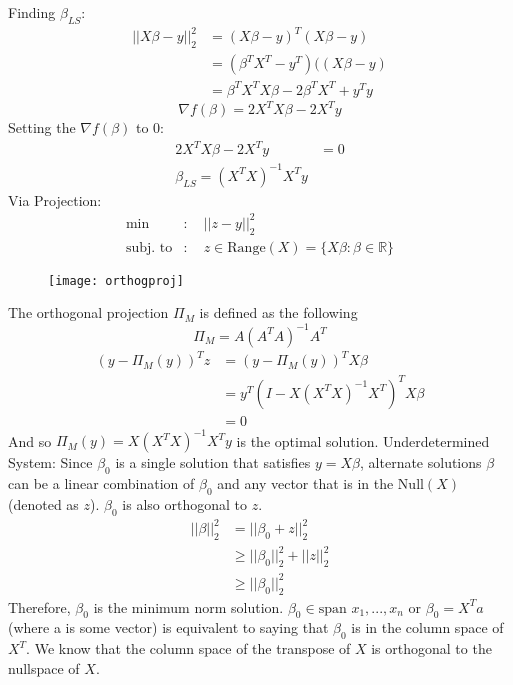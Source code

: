 \documentclass{article}
\begin{document}
\newpage
\noindent
Finding $\beta_{LS}$:
\begin{align*}
	||X\beta - y||^2_2 &= (X\beta - y)^T(X\beta-y) \\
	&= (\beta^TX^T - y^T)((X\beta-y) \\
	&= \beta^TX^TX\beta - 2\beta^TX^T + y^Ty
\end{align*}
\begin{equation*}
	\nabla f(\beta) = 2X^TX\beta - 2X^Ty
\end{equation*}
Setting the $\nabla f(\beta)$ to $0$:
\begin{align*}
	2X^TX\beta - 2X^Ty &= 0 \\
	\beta_{LS} = (X^TX)^{-1}X^Ty
\end{align*}
Via Projection:
\begin{align*}
	\text{min} &: \quad||z - y||^2_2 \\
	\text{subj. to} &: \quad z \in \text{Range}(X) = \{ X\beta : \beta \in \mathbb{R} \}
\end{align*}
\begin{figure}[H]
	\centering
	\texttt{[image: orthogproj]}
\end{figure}
The orthogonal projection $\Pi_M$ is defined as the following
\begin{equation*}
	\Pi_M = A(A^TA)^{-1}A^T
\end{equation*}
\begin{align*}
	(y - \Pi_M(y) )^Tz &= (y - \Pi_M(y) )^TX\beta \\
	&= y^T(I - X(X^TX)^{-1}X^T)^TX\beta \\
	&= 0
\end{align*}
And so $\Pi_M(y) = X(X^TX)^{-1}X^Ty $ is the optimal solution. 
\newpage
\noindent
Underdetermined System:
Since $\beta_0$ is a single solution that satisfies $y = X\beta$, alternate solutions $\beta$ can be a linear combination of $\beta_0$ and any vector that is in the $\text{Null}(X)$ (denoted as $z$). $\beta_0$ is also orthogonal to $z$. 
\begin{align*}
	||\beta||^2_2 &= ||\beta_0 + z||^2_2 \\
	&\geq ||\beta_0||^2_2 + ||z||^2_2 \\
	& \geq ||\beta_0||^2_2
\end{align*}
Therefore, $\beta_0$ is the minimum norm solution. \newline
\newline
\noindent
$\beta_0 \in \text{span } x_1, ..., x_n$ or $\beta_0 = X^Ta$ (where a is some vector) is equivalent to saying that $\beta_0$ is in the column space of $X^T$. We know that the column space of the transpose of $X$ is orthogonal to the nullspace of $X$.
\end{document}

